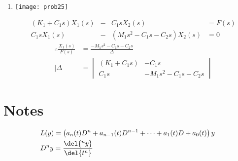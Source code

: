 \documentclass[main.tex]{subfiles}
\begin{document}
\begin{enumerate}
\begin{enumerate}
\begin{align*}
{						}{\Delta} 
					\right| \Delta =
					\begin{vmatrix}
							-R_1-R_2 & R_2
							\\R_1 & -R_2-Ls-\frac{1}{Cs}
					\end{vmatrix}
				\end{align*}
				\begin{align*}
					V_o &= i_2(s)\frac{1}{Cs}
					\\  &= (\frac{-V_iR_1}{\Delta})\frac{1}{Cs}
					\\\therefore \boxed{\frac{V_o}{V_i} = \frac{-R_1}{\Delta Cs}}
				\end{align*}
		\end{enumerate}
	\setcounter{enumi}{24}
  \item
    \begin{minipage}{\textwidth}
      \vspace{0pt}
      \texttt{[image: prob25]}
    \end{minipage}
    \begin{align*}
        (K_1+C_1s)X_1(s)&-&C_1sX_2(s) &= F(s)
      \\C_1sX_1(s)&-&(M_1s^2-C_1s-C_2s)X_2(s) &= 0
    \end{align*}
    \begin{align*}
      \therefore \frac{X_1(s)}{F(s)} &=
	      \frac{-M_1s^2-C_1s-C_2s}{\Delta} 
        \\ | \Delta &= 
        \begin{vmatrix}
            (K_1+C_1s) & -C_1s
          \\C_1s & -M_1s^2-C_1s-C_2s
        \end{vmatrix}
    \end{align*}
\end{enumerate}

\section*{Notes} 
\label{sec:notes}
	\begin{align*}
		  & L(y) = \left(a_n(t)D^n + a_{n-1}(t)D^{n-1} + \cdots + a_1(t)D + a_0(t) \right)y
		\\& D^{n}y = \frac{\del{^ny}}{\del{t^n}}
	\end{align*}
\end{document}
